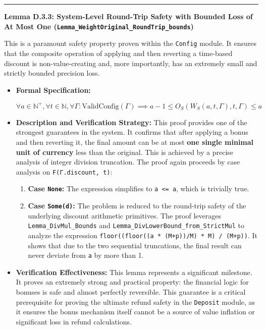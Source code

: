 \documentclass[
  english,
  onecolumn]{article}
\providecommand{\tightlist}{%
  \setlength{\itemsep}{0pt}\setlength{\parskip}{0pt}}
\begin{document}
\begin{center}\rule{0.5\linewidth}{0.5pt}\end{center}

\textbf{Lemma D.3.3: System-Level Round-Trip Safety with Bounded Loss of
At Most One (\texttt{Lemma\_WeightOriginal\_RoundTrip\_bounds}) }

This is a paramount safety property proven within the \texttt{Config}
module. It ensures that the composite operation of applying and then
reverting a time-based discount is non-value-creating and, more
importantly, has an extremely small and strictly bounded precision loss.

\begin{itemize}
\item
  \textbf{Formal Specification:}

  \(\forall a \in \mathbb{N}^+, \forall t \in \mathbb{N}, \forall \Gamma : \text{ValidConfig}(\Gamma) \implies a - 1 \le O_S(W_S(a, t, \Gamma), t, \Gamma) \le a\)
\item
  \textbf{Description and Verification Strategy:} This proof provides
  one of the strongest guarantees in the system. It confirms that after
  applying a bonus and then reverting it, the final amount can be at
  most \textbf{one single minimal unit of currency} less than the
  original. This is achieved by a precise analysis of integer division
  truncation. The proof again proceeds by case analysis on
  \texttt{F(Γ.discount,\ t)}:

  \begin{enumerate}
  \def\labelenumi{\arabic{enumi}.}
  \tightlist
  \item
    \textbf{Case \texttt{None}:} The expression simplifies to
    \texttt{a\ \textless{}=\ a}, which is trivially true.
  \item
    \textbf{Case \texttt{Some(d)}:} The problem is reduced to the
    round-trip safety of the underlying discount arithmetic primitives.
    The proof leverages \texttt{Lemma\_DivMul\_Bounds} and
    \texttt{Lemma\_DivLowerBound\_from\_StrictMul} to analyze the
    expression \texttt{floor((floor((a\ *\ (M+p))/M)\ *\ M)\ /\ (M+p))}.
    It shows that due to the two sequential truncations, the final
    result can never deviate from \texttt{a} by more than 1.
  \end{enumerate}
\item
  \textbf{Verification Effectiveness:} This lemma represents a
  significant milestone. It proves an extremely strong and practical
  property: the financial logic for bonuses is safe and almost perfectly
  reversible. This guarantee is a critical prerequisite for proving the
  ultimate refund safety in the \texttt{Deposit} module, as it ensures
  the bonus mechanism itself cannot be a source of value inflation or
  significant loss in refund calculations.
\end{itemize}
\end{document}
